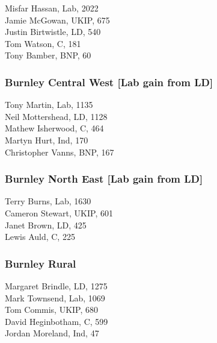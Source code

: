 \documentclass[a4paper,openany,10pt]{book}
\begin{document}
Misfar Hassan, Lab, 2022\\
Jamie McGowan, UKIP, 675\\
Justin Birtwistle, LD, 540\\
Tom Watson, C, 181\\
Tony Bamber, BNP, 60\\


\subsubsection*{Burnley Central West \hspace*{\fill}\nolinebreak[1]%
\enspace\hspace*{\fill}
[Lab gain from LD]}



Tony Martin, Lab, 1135\\
Neil Mottershead, LD, 1128\\
Mathew Isherwood, C, 464\\
Martyn Hurt, Ind, 170\\
Christopher Vanns, BNP, 167\\


\subsubsection*{Burnley North East \hspace*{\fill}\nolinebreak[1]%
\enspace\hspace*{\fill}
[Lab gain from LD]}



Terry Burns, Lab, 1630\\
Cameron Stewart, UKIP, 601\\
Janet Brown, LD, 425\\
Lewis Auld, C, 225\\


\subsubsection*{Burnley Rural}



Margaret Brindle, LD, 1275\\
Mark Townsend, Lab, 1069\\
Tom Commis, UKIP, 680\\
David Heginbotham, C, 599\\
Jordan Moreland, Ind, 47\\
\end{document}
